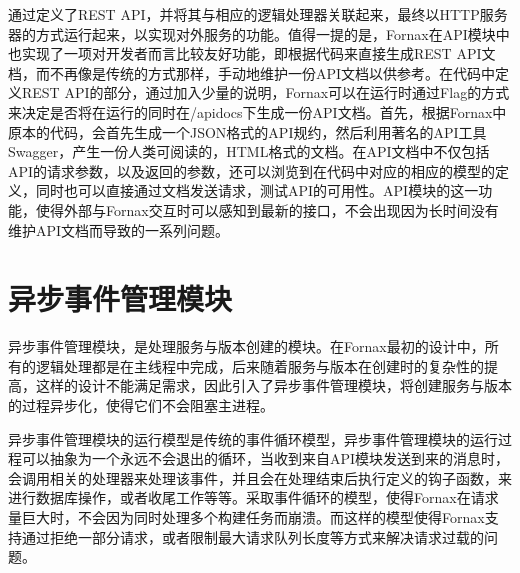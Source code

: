 通过定义了REST API，并将其与相应的逻辑处理器关联起来，最终以HTTP服务器的方式运行起来，以实现对外服务的功能。值得一提的是，Fornax在API模块中也实现了一项对开发者而言比较友好功能，即根据代码来直接生成REST API文档，而不再像是传统的方式那样，手动地维护一份API文档以供参考。在代码中定义REST API的部分，通过加入少量的说明，Fornax可以在运行时通过Flag的方式来决定是否将在运行的同时在/apidocs下生成一份API文档。首先，根据Fornax中原本的代码，会首先生成一个JSON格式的API规约，然后利用著名的API工具Swagger，产生一份人类可阅读的，HTML格式的文档。在API文档中不仅包括API的请求参数，以及返回的参数，还可以浏览到在代码中对应的相应的模型的定义，同时也可以直接通过文档发送请求，测试API的可用性。API模块的这一功能，使得外部与Fornax交互时可以感知到最新的接口，不会出现因为长时间没有维护API文档而导致的一系列问题。

\section{异步事件管理模块}

异步事件管理模块，是处理服务与版本创建的模块。在Fornax最初的设计中，所有的逻辑处理都是在主线程中完成，后来随着服务与版本在创建时的复杂性的提高，这样的设计不能满足需求，因此引入了异步事件管理模块，将创建服务与版本的过程异步化，使得它们不会阻塞主进程。

异步事件管理模块的运行模型是传统的事件循环模型，异步事件管理模块的运行过程可以抽象为一个永远不会退出的循环，当收到来自API模块发送到来的消息时，会调用相关的处理器来处理该事件，并且会在处理结束后执行定义的钩子函数，来进行数据库操作，或者收尾工作等等。采取事件循环的模型，使得Fornax在请求量巨大时，不会因为同时处理多个构建任务而崩溃。而这样的模型使得Fornax支持通过拒绝一部分请求，或者限制最大请求队列长度等方式来解决请求过载的问题。



